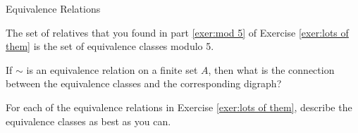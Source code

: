 \begin{section}{Equivalence Relations}
\begin{example}
The set of relatives that you found in part \ref{exer:mod 5} of Exercise \ref{exer:lots of them} is the set of equivalence classes modulo 5.
\end{example}

\begin{exercise}
If $\sim$ is an equivalence relation on a finite set $A$, then what is the connection between the equivalence classes and the corresponding digraph?
\end{exercise}

\begin{exercise}
For each of the equivalence relations in Exercise \ref{exer:lots of them}, describe the equivalence classes as best as you can.
\end{exercise}

\end{section}
